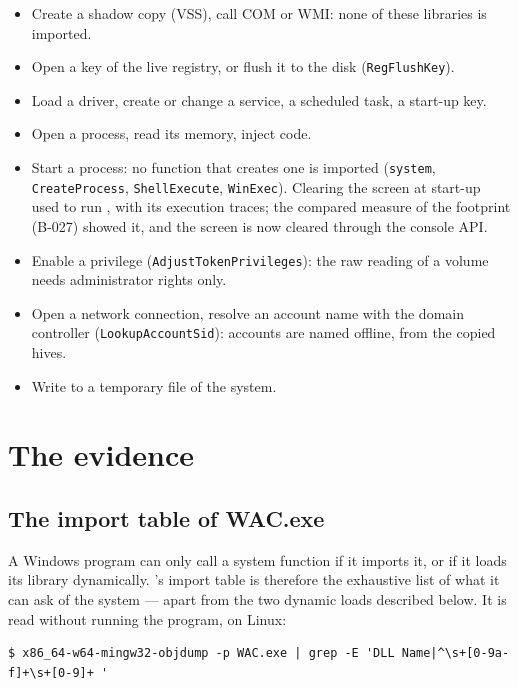 \documentclass[11pt,a4paper,oneside]{report}
\begin{document}
\begin{itemize}
  \item Create a shadow copy (VSS), call COM or WMI: none of these libraries
        is imported.
  \item Open a key of the live registry, or flush it to the disk
        (\texttt{RegFlushKey}).
  \item Load a driver, create or change a service, a scheduled task, a
        start-up key.
  \item Open a process, read its memory, inject code.
  \item Start a process: no function that creates one is imported
        (\texttt{system}, \texttt{CreateProcess}, \texttt{ShellExecute},
        \texttt{WinExec}). Clearing the screen at start-up used to run
        , with its execution traces; the compared
        measure of the footprint (B-027) showed it, and the screen is now
        cleared through the console API.
  \item Enable a privilege (\texttt{AdjustTokenPrivileges}): the raw reading
        of a volume needs administrator rights only.
  \item Open a network connection, resolve an account name with the domain
        controller (\texttt{LookupAccountSid}): accounts are named offline,
        from the copied hives.
  \item Write to a temporary file of the system.
\end{itemize}

\chapter{The evidence}\label{ch:preuves}

\section{The import table of WAC.exe}

A Windows program can only call a system function if it imports it, or if it
loads its library dynamically. 's import table is therefore
the exhaustive list of what it can ask of the system — apart from the two
dynamic loads described below. It is read without running the program, on
Linux:

\begin{lstlisting}
$ x86_64-w64-mingw32-objdump -p WAC.exe | grep -E 'DLL Name|^\s+[0-9a-f]+\s+[0-9]+ '
\end{lstlisting}
\end{document}
